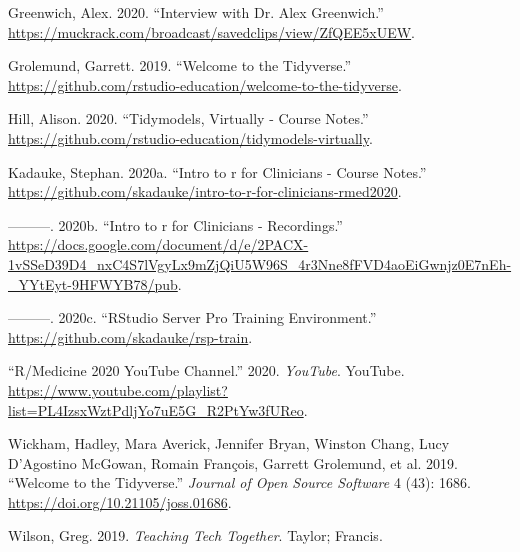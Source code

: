 \hypertarget{refs}{}
\begin{CSLReferences}{1}{0}
\leavevmode{}%
Greenwich, Alex. 2020. {``Interview with Dr. Alex Greenwich.''} \url{https://muckrack.com/broadcast/savedclips/view/ZfQEE5xUEW}.

\leavevmode{}%
Grolemund, Garrett. 2019. {``Welcome to the Tidyverse.''} \url{https://github.com/rstudio-education/welcome-to-the-tidyverse}.

\leavevmode{}%
Hill, Alison. 2020. {``Tidymodels, Virtually - Course Notes.''} \url{https://github.com/rstudio-education/tidymodels-virtually}.

\leavevmode{}%
Kadauke, Stephan. 2020a. {``Intro to r for Clinicians - Course Notes.''} \url{https://github.com/skadauke/intro-to-r-for-clinicians-rmed2020}.

\leavevmode{}%
---------. 2020b. {``Intro to r for Clinicians - Recordings.''} \url{https://docs.google.com/document/d/e/2PACX-1vSSeD39D4_nxC4S7lVgyLx9mZjQiU5W96S_4r3Nne8fFVD4aoEiGwnjz0E7nEh-_YYtEyt-9HFWYB78/pub}.

\leavevmode{}%
---------. 2020c. {``RStudio Server Pro Training Environment.''} \url{https://github.com/skadauke/rsp-train}.

\leavevmode{}%
{``R/Medicine 2020 YouTube Channel.''} 2020. \emph{YouTube}. YouTube. \url{https://www.youtube.com/playlist?list=PL4IzsxWztPdljYo7uE5G_R2PtYw3fUReo}.

\leavevmode{}%
Wickham, Hadley, Mara Averick, Jennifer Bryan, Winston Chang, Lucy D'Agostino McGowan, Romain François, Garrett Grolemund, et al. 2019. {``Welcome to the Tidyverse.''} \emph{Journal of Open Source Software} 4 (43): 1686. \url{https://doi.org/10.21105/joss.01686}.

\leavevmode{}%
Wilson, Greg. 2019. \emph{Teaching Tech Together}. Taylor; Francis.

\end{CSLReferences}



\address{%
Elizabeth J. Atkinson\\
Department of Quantitative Health Sciences, Mayo Clinic\\%
200 First Street SW\\ Rochester, MN 55905\\
%
%
\textit{ORCiD: \href{https://orcid.org/0000-0002-1191-3775}{0000-0002-1191-3775}}\\%
\href{mailto:atkinson@mayo.edu}{\nolinkurl{atkinson@mayo.edu}}%
}

